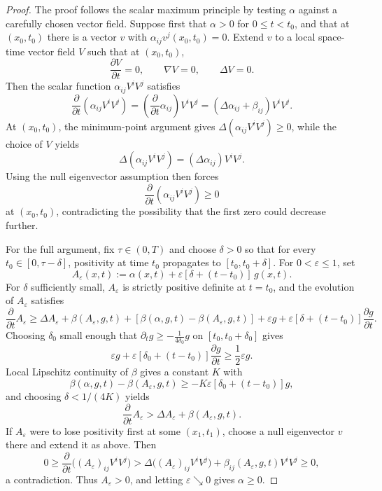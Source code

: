 \begin{proof}
\sketch The proof follows the scalar maximum principle by testing \(\alpha\) against a carefully chosen vector field. Suppose first that \(\alpha>0\) for \(0\le t<t_0\), and that at \((x_0,t_0)\) there is a vector \(v\) with \(\alpha_{ij}v^j(x_0,t_0)=0\). Extend \(v\) to a local space-time vector field \(V\) such that at \((x_0,t_0)\),
\[
\frac{\partial V}{\partial t}=0,\qquad \nabla V=0,\qquad \Delta V=0.
\]
Then the scalar function \(\alpha_{ij}V^iV^j\) satisfies
\[
\frac{\partial}{\partial t}(\alpha_{ij}V^iV^j)
 = \left(\frac{\partial}{\partial t}\alpha_{ij}\right)V^iV^j
 = (\Delta\alpha_{ij}+\beta_{ij})V^iV^j.
\]
At \((x_0,t_0)\), the minimum-point argument gives \(\Delta(\alpha_{ij}V^iV^j)\ge 0\), while the choice of \(V\) yields
\[
\Delta(\alpha_{ij}V^iV^j)=(\Delta\alpha_{ij})V^iV^j.
\]
Using the null eigenvector assumption then forces
\[
\frac{\partial}{\partial t}(\alpha_{ij}V^iV^j)\ge 0
\]
at \((x_0,t_0)\), contradicting the possibility that the first zero could decrease further.

For the full argument, fix \(\tau \in (0,T)\) and choose \(\delta>0\) so that for every \(t_0\in[0,\tau-\delta]\), positivity at time \(t_0\) propagates to \([t_0,t_0+\delta]\). For \(0<\varepsilon\le 1\), set
\[
A_\varepsilon(x,t):=\alpha(x,t)+\varepsilon[\delta+(t-t_0)]\,g(x,t).
\]
For \(\delta\) sufficiently small, \(A_\varepsilon\) is strictly positive definite at \(t=t_0\), and the evolution of \(A_\varepsilon\) satisfies
\[
\frac{\partial}{\partial t}A_\varepsilon
\ge \Delta A_\varepsilon+\beta(A_\varepsilon,g,t)+[\beta(\alpha,g,t)-\beta(A_\varepsilon,g,t)]+\varepsilon g+\varepsilon[\delta+(t-t_0)]\frac{\partial g}{\partial t}.
\]
Choosing \(\delta_0\) small enough that \(\partial_t g\ge -\frac1{4\delta_0}g\) on \([t_0,t_0+\delta_0]\) gives
\[
\varepsilon g+\varepsilon[\delta_0+(t-t_0)]\frac{\partial g}{\partial t}\ge \frac12 \varepsilon g.
\]
Local Lipschitz continuity of \(\beta\) gives a constant \(K\) with
\[
\beta(\alpha,g,t)-\beta(A_\varepsilon,g,t)\ge -K\varepsilon[\delta_0+(t-t_0)]g,
\]
and choosing \(\delta<1/(4K)\) yields
\[
\frac{\partial}{\partial t}A_\varepsilon>\Delta A_\varepsilon+\beta(A_\varepsilon,g,t).
\]
If \(A_\varepsilon\) were to lose positivity first at some \((x_1,t_1)\), choose a null eigenvector \(v\) there and extend it as above. Then
\[
0\ge \frac{\partial}{\partial t}\bigl((A_\varepsilon)_{ij}V^iV^j\bigr)
> \Delta\bigl((A_\varepsilon)_{ij}V^iV^j\bigr)+\beta_{ij}(A_\varepsilon,g,t)V^iV^j\ge 0,
\]
a contradiction. Thus \(A_\varepsilon>0\), and letting \(\varepsilon\searrow 0\) gives \(\alpha\ge 0\).
\end{proof}

